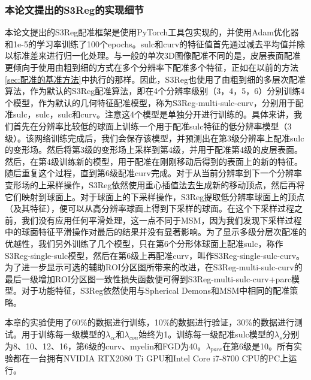\subsubsection{本论文提出的S3Reg的实现细节}
本论文提出的S3Reg配准框架是使用PyTorch\cite{paszke2017automatic}工具包实现的，并使用Adam优化器\cite{kingma2014adam}和1e-5的学习率训练了100个epochs。sulc和curv的特征值首先通过减去平均值并除以标准差来进行归一化处理。与一般的单次3D图像配准不同的是，皮层表面配准更倾向于使用由粗到细的方式在多个分辨率下配准多个特征，正如在以前的方法\ref{sec:配准的基准方法}中执行的那样。因此，S3Reg也使用了由粗到细的多层次配准算法，作为默认的S3Reg配准算法，即在4个分辨率级别（3，4，5，6）分别训练4个模型，作为默认的几何特征配准模型，称为S3Reg-multi-sulc-curv，分别用于配准sulc，sulc，sulc和curv。注意这4个模型是单独分开进行训练的。具体来讲，我们首先在分辨率比较低的球面上训练一个用于配准sulc特征的低分辨率模型（3级）。该网络训练完成后，我们会保存该模型，并预测出在第3级分辨率上配准sulc的变形场。然后将第3级的变形场上采样到第4级，并用于配准第4级的皮层表面。然后，在第4级训练新的模型，用于配准在刚刚移动后得到的表面上的新的特征。随后重复这个过程，直到第6级配准curv完成。对于从当前分辨率到下一个分辨率变形场的上采样操作，S3Reg依然使用重心插值法去生成新的移动顶点，然后再将它们映射到球面上。对于球面上的下采样操作，S3Reg提取低分辨率球面上的顶点（及其特征），便可以从高分辨率球面上得到下采样的球面。在这个下采样过程之前，我们没有应用任何平滑处理，这一点不同于MSM\cite{robinson2014msm}，因为我们发现下采样过程中的球面特征平滑操作对最后的结果并没有显著影响。为了显示多级分层次配准的优越性，我们另外训练了几个模型，只在第6个分形体球面上配准sulc，称作S3Reg-single-sulc模型，然后在第6级上再配准curv，叫作S3Reg-single-sulc-curv。为了进一步显示可选的辅助ROI分区图所带来的改进，在S3Reg-multi-sulc-curv的最后一级增加ROI分区图一致性损失函数便可得到S3Reg-multi-sulc-curv+parc模型。对于功能特征，S3Reg依然使用与Spherical Demons和MSM中相同的配准策略。

本章的实验使用了60\%的数据进行训练，10\%的数据进行验证，30\%的数据进行测试。用于训练每一级模型的$\lambda_{cc}$和$\lambda_{con}$始终为1。训练每一级配准sulc模型的$\lambda_s$分别为8、10、12、16，第6级的curv、myelin和FGD为40。$\lambda_{parc}$在第6级是10。所有实验都在一台拥有NVIDIA RTX2080 Ti GPU和Intel Core i7-8700 CPU的PC上运行。

